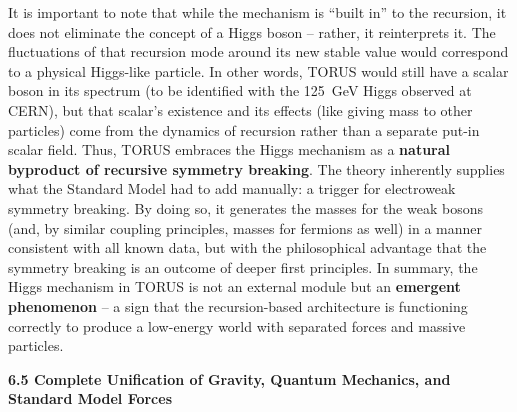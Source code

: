 \documentclass[]{article}
\begin{document}
It is important to note that while the mechanism is ``built in'' to the
recursion, it does not eliminate the concept of a Higgs boson -- rather,
it reinterprets it. The fluctuations of that recursion mode around its
new stable value would correspond to a physical Higgs-like particle. In
other words, TORUS would still have a scalar boson in its spectrum (to
be identified with the 125~GeV Higgs observed at CERN), but that
scalar's existence and its effects (like giving mass to other particles)
come from the dynamics of recursion rather than a separate put-in scalar
field. Thus, TORUS embraces the Higgs mechanism as a \textbf{natural
byproduct of recursive symmetry breaking}​. The theory inherently
supplies what the Standard Model had to add manually: a trigger for
electroweak symmetry breaking. By doing so, it generates the masses for
the weak bosons (and, by similar coupling principles, masses for
fermions as well) in a manner consistent with all known data, but with
the philosophical advantage that the symmetry breaking is an outcome of
deeper first principles. In summary, the Higgs mechanism in TORUS is not
an external module but an \textbf{emergent phenomenon} -- a sign that
the recursion-based architecture is functioning correctly to produce a
low-energy world with separated forces and massive particles.

\textbf{6.5 Complete Unification of Gravity, Quantum Mechanics, and
Standard Model Forces}
\end{document}
